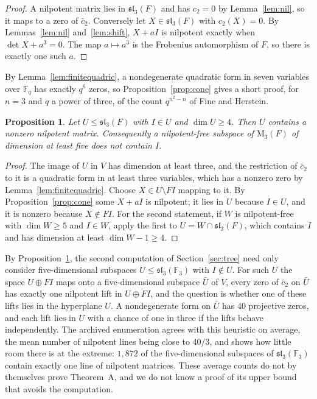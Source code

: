 \documentclass[screen]{aomart}
\newtheorem{proposition}[theorem]{Proposition}
\theoremstyle{definition}
\theoremstyle{remark}
\numberwithin{equation}{section}
\newcommand{\F}{\mathbb{F}}
\newcommand{\M}{\mathrm{M}}
\newcommand{\sll}{\mathfrak{sl}}
\begin{document}
\begin{proof}
A nilpotent matrix lies in $\sll_3(F)$ and has $c_2=0$ by Lemma~\ref{lem:nil}, so it maps to a zero of $\bar c_2$. Conversely let $X\in\sll_3(F)$ with $c_2(X)=0$. By Lemmas~\ref{lem:nil} and~\ref{lem:shift}, $X+aI$ is nilpotent exactly when $\det X+a^3=0$. The map $a\mapsto a^3$ is the Frobenius automorphism of $F$, so there is exactly one such $a$.
\end{proof}

By Lemma~\ref{lem:finitequadric}, a nondegenerate quadratic form in seven variables over $\F_q$ has exactly $q^6$ zeros, so Proposition~\ref{prop:cone} gives a short proof, for $n=3$ and $q$ a power of three, of the count $q^{n^2-n}$ of Fine and Herstein.

\begin{proposition}\label{prop:identity}
Let $U\le\sll_3(F)$ with $I\in U$ and $\dim U\ge4$. Then $U$ contains a nonzero nilpotent matrix. Consequently a nilpotent-free subspace of $\M_3(F)$ of dimension at least five does not contain $I$.
\end{proposition}

\begin{proof}
The image of $U$ in $V$ has dimension at least three, and the restriction of $\bar c_2$ to it is a quadratic form in at least three variables, which has a nonzero zero by Lemma~\ref{lem:finitequadric}. Choose $X\in U\setminus FI$ mapping to it. By Proposition~\ref{prop:cone} some $X+aI$ is nilpotent; it lies in $U$ because $I\in U$, and it is nonzero because $X\notin FI$. For the second statement, if $W$ is nilpotent-free with $\dim W\ge5$ and $I\in W$, apply the first to $U=W\cap\sll_3(F)$, which contains $I$ and has dimension at least $\dim W-1\ge4$.
\end{proof}

By Proposition~\ref{prop:identity}, the second computation of Section~\ref{sec:tree} need only consider five-dimensional subspaces $U\le\sll_3(\F_3)$ with $I\notin U$. For such $U$ the space $U\oplus FI$ maps onto a five-dimensional subspace $\bar U$ of $V$, every zero of $\bar c_2$ on $\bar U$ has exactly one nilpotent lift in $U\oplus FI$, and the question is whether one of these lifts lies in the hyperplane $U$. A nondegenerate form on $\bar U$ has $40$ projective zeros, and each lift lies in $U$ with a chance of one in three if the lifts behave independently. The archived enumeration agrees with this heuristic on average, the mean number of nilpotent lines being close to $40/3$, and shows how little room there is at the extreme: $1{,}872$ of the five-dimensional subspaces of $\sll_3(\F_3)$ contain exactly one line of nilpotent matrices. These average counts do not by themselves prove Theorem~A, and we do not know a proof of its upper bound that avoids the computation.
\end{document}
